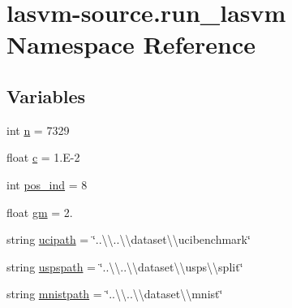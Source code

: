 \hypertarget{namespacelasvm-source_1_1run__lasvm}{\section{lasvm-\/source.run\+\_\+lasvm Namespace Reference}
\label{namespacelasvm-source_1_1run__lasvm}
}
\subsection*{Variables}
\begin{DoxyCompactItemize}
\item 
int \hyperlink{namespacelasvm-source_1_1run__lasvm_a858eb588c72a3613e58b0cd92fdc779e}{n} = 7329
\item 
float \hyperlink{namespacelasvm-source_1_1run__lasvm_a106cbe64a3239a66754cf947632da25d}{c} = 1.\+E-\/2
\item 
int \hyperlink{namespacelasvm-source_1_1run__lasvm_a860f4a5744b2c425893b728f9264aff2}{pos\+\_\+ind} = 8
\item 
float \hyperlink{namespacelasvm-source_1_1run__lasvm_a248bc008243cf2649d6f1ad75af8ba1b}{gm} = 2.
\item 
string \hyperlink{namespacelasvm-source_1_1run__lasvm_ab22c76535229d7ac2713555825b802e6}{ucipath} = \char`\"{}..\textbackslash{}\textbackslash{}..\textbackslash{}\textbackslash{}dataset\textbackslash{}\textbackslash{}ucibenchmark\char`\"{}
\item 
string \hyperlink{namespacelasvm-source_1_1run__lasvm_abcfd16c897e8fc5624b77fcb7dd4e4bd}{uspspath} = \char`\"{}..\textbackslash{}\textbackslash{}..\textbackslash{}\textbackslash{}dataset\textbackslash{}\textbackslash{}usps\textbackslash{}\textbackslash{}split\char`\"{}
\item 
string \hyperlink{namespacelasvm-source_1_1run__lasvm_ad38844cb34f54e26a42547412e461e8a}{mnistpath} = \char`\"{}..\textbackslash{}\textbackslash{}..\textbackslash{}\textbackslash{}dataset\textbackslash{}\textbackslash{}mnist\char`\"{}
\end{DoxyCompactItemize}


